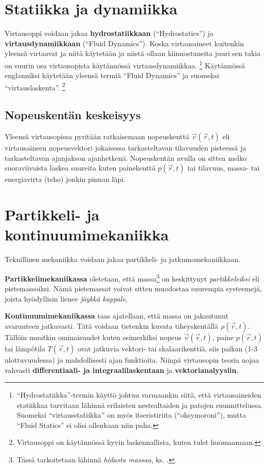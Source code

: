 \documentclass[12pt,a4paper,finnish]{book}
\begin{document}
\section{Statiikka ja dynamiikka}
Virtausoppi voidaan jakaa \textbf{hydrostatiikkaan} (``Hydrostatics'') ja \textbf{virtausdynamiikkaan} 
(``Fluid Dynamics''). Koska virtausaineet kuitenkin yleensä virtaavat ja niitä käytetään ja niistä 
ollaan kiinnostuneita juuri sen takia on suurin osa virtausopista käytännössä virtausdynamiikkaa.
\footnote{``Hydrostatiikka''-termin käyttö johtuu varmaankin siitä, että virtausaineiden statiikkaa 
tarvitaan lähinnä erilaisten nestealtaiden ja patojen suunnittelussa. Suomeksi ``virtausstatiikka'' 
on myös itseristiriita (``oksymoroni''), mutta ``Fluid Statics'' ei olisi ollenkaan niin paha.}
Käytännössä englanniksi käytetään yleensä termiä ``Fluid Dynamics'' ja suomeksi ``virtauslaskenta''.
\footnote{Virtausoppi on käytännössä hyvin laskennallista, kuten tulet huomaamaan.}


\subsection{Nopeuskentän keskeisyys}
Yleensä virtausopissa pyritään ratkaisemaan nopeuskenttä \(\vec{v}(\vec{r}, t)\) eli virtausaineen 
nopeusvektori jokaisessa tarkasteltavan tilavuuden pisteessä ja tarkasteltavan ajanjakson 
ajanhetkenä. Nopeuskentän avulla on sitten melko suoraviivaista laskea suureita kuten painekenttä 
\(p(\vec{r}, t)\) tai tilavuus, massa- tai energiavirta (teho) jonkin pinnan läpi.

\section{Partikkeli- ja kontinuumimekaniikka}
Teknillinen mekaniikka voidaan jakaa partikkeli- ja jatkumomekaniikkaan. 

\textbf{Partikkelimekaniikassa} oletetaan, 
että massa\footnote{Tässä tarkoitetaan lähinnä \textit{hidasta massaa}, ks. .} on 
keskittynyt \textit{partikkeleiksi} eli pistemassoiksi. Nämä pistemassat voivat sitten muodostaa 
suurempia systeemejä, joista hyödyllisin lienee \textit{jäykkä kappale}.

\textbf{Kontinuumimekaniikassa} taas ajatellaan, että massa on jakautunut avaruuteen jatkuvasti. 
Tätä voidaan tietenkin kuvata tiheyskentällä \(\rho(\vec{r}, t)\). Tällöin muutkin ominaisuudet kuten 
esimerkiksi nopeus \(\vec{v}(\vec{r}, t)\), paine \(p(\vec{r}, t)\) tai lämpötila \(T(\vec{r}, t)\) 
ovat jatkuvia vektori- tai skalaarikenttiä, siis paikan (1-3 ulottuvuudessa) ja mahdollisesti 
ajan funktioita. Niinpä virtausopin teoria nojaa vahvasti \textbf{differentiaali- ja integraalilaskentaan} 
ja \textbf{vektorianalyysiin}.
\end{document}
